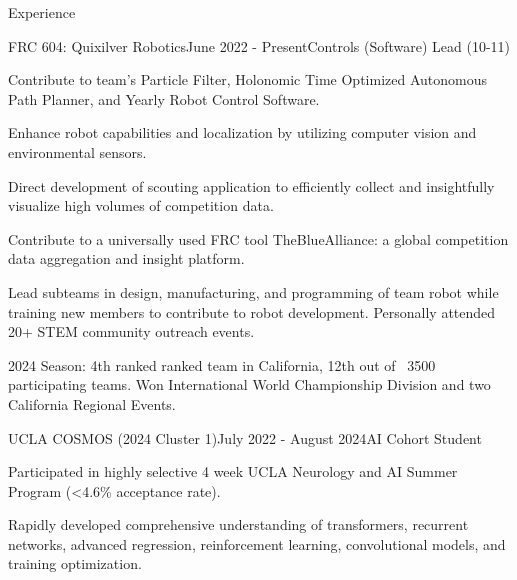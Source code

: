 \documentclass[
  11pt, %
]{public/resume/resume} %
\begin{document}

\begin{rSection}{Experience}


  \begin{rSubsection}{FRC 604: Quixilver Robotics}{June 2022 - Present}{Controls (Software) Lead (10-11)}{}
    
    \item Contribute to team's Particle Filter, Holonomic Time Optimized Autonomous Path Planner, and Yearly Robot Control Software.
    
    \item Enhance robot capabilities and localization by utilizing computer vision and environmental sensors.
    
    \item Direct development of scouting application to efficiently collect and insightfully visualize high volumes of competition data.
    
    \item Contribute to a universally used FRC tool TheBlueAlliance: a global competition data aggregation and insight platform.
    
    \item Lead subteams in design, manufacturing, and programming of team robot while training new members to contribute to robot development. Personally attended 20+ STEM community outreach events.
    
    \item 2024 Season: 4th ranked ranked team in California, 12th out of ~3500 participating teams. Won International World Championship Division and two California Regional Events.
    
  \end{rSubsection}
        
  \begin{rSubsection}{UCLA COSMOS (2024 Cluster 1)}{July 2022 - August 2024}{AI Cohort Student}{}
    
    \item Participated in highly selective 4 week UCLA Neurology and AI Summer Program (<4.6\% acceptance rate).
    
    \item Rapidly developed comprehensive understanding of transformers, recurrent networks, advanced regression, reinforcement learning, convolutional models, and training optimization.
    

\end{rSubsection}
\end{rSection}
\end{document}

